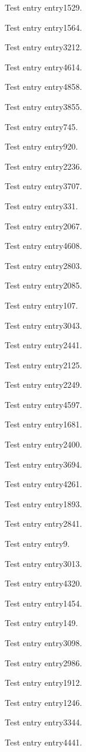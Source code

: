 Test entry \gls{entry1529}.

Test entry \gls{entry1564}.

Test entry \gls{entry3212}.

Test entry \gls{entry4614}.

Test entry \gls{entry4858}.

Test entry \gls{entry3855}.

Test entry \gls{entry745}.

Test entry \gls{entry920}.

Test entry \gls{entry2236}.

Test entry \gls{entry3707}.

Test entry \gls{entry331}.

Test entry \gls{entry2067}.

Test entry \gls{entry4608}.

Test entry \gls{entry2803}.

Test entry \gls{entry2085}.

Test entry \gls{entry107}.

Test entry \gls{entry3043}.

Test entry \gls{entry2441}.

Test entry \gls{entry2125}.

Test entry \gls{entry2249}.

Test entry \gls{entry4597}.

Test entry \gls{entry1681}.

Test entry \gls{entry2400}.

Test entry \gls{entry3694}.

Test entry \gls{entry4261}.

Test entry \gls{entry1893}.

Test entry \gls{entry2841}.

Test entry \gls{entry9}.

Test entry \gls{entry3013}.

Test entry \gls{entry4320}.

Test entry \gls{entry1454}.

Test entry \gls{entry149}.

Test entry \gls{entry3098}.

Test entry \gls{entry2986}.

Test entry \gls{entry1912}.

Test entry \gls{entry1246}.

Test entry \gls{entry3344}.

Test entry \gls{entry4441}.


